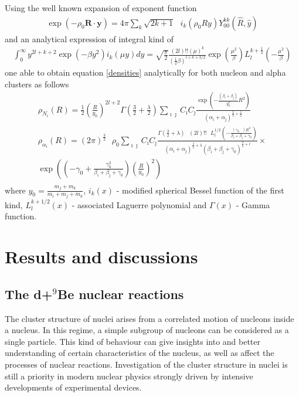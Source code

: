 \documentclass[
12pt, %
oneside, %
english, %
onehalfspacing, %
headsepline, %
]{MastersDoctoralThesis} %
\begin{document}
 Using the well known expansion of exponent function
\begin{align*}
\exp(-\rho_0 \textbf{R} \cdot \textbf{y} )=
4 \pi \sum_k \sqrt{2k+1} \text{ } i_k(\rho_0 R y) Y^{kk}_{00} \left( \widehat{R},\widehat{y} \right)
\end{align*}
and an analytical expression of integral kind of
\begin{align*}
\int_0^\infty y^{2l+k+2}\exp(-\beta y^2)i_k(\mu y) dy=
\sqrt{\frac{\pi}{2}} \frac{   (2l)!!   (\mu)^k}{   \left( \frac{1}{2}\beta \right)^{l+k+3/2}   }
\exp \left( \frac{\mu^2}{\beta} \right) L^{k+\frac{1}{2}}_{l}   \left( -\frac{\mu^2}{\beta} \right)
\end{align*}
one able to obtain equation \eqref{densities}  analytically for both nucleon and alpha clusters as follows
\begin{equation}
\begin{gathered}
 \rho_{N_i}({R})=  
 \frac{1}{2}  
 \left( \frac{R}{y_0} \right)^{2l+2}
 \Gamma \left( \frac{3}{2}+\frac{\lambda}{2} \right)
 \sum_{{\imath}{\jmath}} C_{\imath} C_{\jmath}
 \frac{ \exp  \left( - \frac{ \left(  \beta_{\imath} + \beta_{\jmath}  \right)}{y_0^2} R^2 \right) }
 		{   \left( \alpha_{\imath}+\alpha_{\jmath} \right)^{\frac{3}{2}+\frac{\lambda}{2}} } 
   \\
   \rho_{\alpha_i}({R})= 
(2 \pi)^{\frac{3}{2}}  \text{ }  \rho_0
\sum_{\imath \jmath} C_{\imath} C_{\jmath}
 \frac{\Gamma \left( \frac{3}{2}+\lambda \right) \text{ }    (2l)!! \text{ }   L^{ 1/2}_l \left( -\frac{\left(\gamma_0 \text{ } \right) R^2}{\beta_{\imath} + \beta_{\jmath} + \gamma_0} \right)  } 
 	{ \left( \alpha_{\imath}+\alpha_{\jmath} \right)^{\frac{3}{2} + \lambda }  \left(  \beta_{\imath} + \beta_{\jmath} + \gamma_0 \right)^{\frac{3}{2}+l}}  \times \\
 	\exp \left( \left( -\gamma_0 + \frac{\gamma_0^2}{\beta_{\imath} + \beta_{\jmath} + \gamma_0} \right) \left( \frac{R}{y_0} \right)^2 \right) \\
 \end{gathered} 
\end{equation}
where $y_0=\frac{m_j+m_k}{m_i+m_j+m_k}$, $ i_k(x)$ - modified spherical Bessel function  of the first kind, $L_{l}^{k+1/2}(x)$ - associated Laguerre polynomial and $\Gamma (x)$ - Gamma function.


\chapter{Results and discussions}
\section{The d+$^9$Be nuclear reactions}
The cluster structure of nuclei arises from a correlated motion of nucleons inside a nucleus. In this regime, a simple subgroup of nucleons can be considered as a single particle.
This kind of behaviour can give insights into and better understanding of certain characteristics of the nucleus, as well as affect the processes of nuclear reactions. 
Investigation  of the cluster structure in nuclei is still a priority in modern nuclear physics strongly driven by intensive developments of experimental devices.\\
\end{document}

